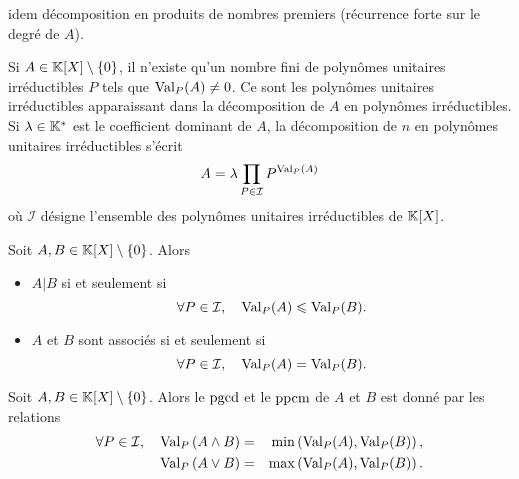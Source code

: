 \documentclass{magnolia}
\begin{document}
\begin{preuve}
idem décomposition en produits de nombres premiers (récurrence forte sur le degré de $A$).
\end{preuve}


\begin{remarques}
\remarque Si $A\in\polyK\setminus\ens{0}$, il n'existe qu'un nombre fini de polynômes unitaires irréductibles $P$ tels que
  ${\rm Val}_P(A)\neq 0$. Ce sont les polynômes unitaires irréductibles apparaissant dans la décomposition
  de $A$ en polynômes irréductibles.
\remarque Si $\lambda\in\mathbb{K}^*$ est le coefficient dominant de $A$, la décomposition de $n$ en polynômes
  unitaires irréductibles s'écrit
  \[A=\lambda \prod_{P\in\mathcal{I}} P^{{\rm Val}_P(A)}\]
  où $\mathcal{I}$ désigne l'ensemble des polynômes unitaires irréductibles
  de $\polyK$.
\end{remarques}

\begin{proposition}
Soit $A,B\in\polyK\setminus\ens{0}$. Alors
\begin{itemize}
\item $A|B$ si et seulement si
  \[\forall P\in\mathcal{I} ,\quad {\rm Val}_P(A)\leqslant {\rm Val}_P(B).\]
\item $A$ et $B$ sont associés si et seulement si
  \[\forall P\in\mathcal{I} ,\quad {\rm Val}_P(A)= {\rm Val}_P(B).\]
\end{itemize}
\end{proposition}

\begin{proposition}
Soit $A,B\in\polyK\setminus\ens{0}$. Alors le $\operatorname{pgcd}$ et le $\operatorname{ppcm}$ de $A$ et $B$ est donné par les relations
  \begin{eqnarray*}
  \forall P\in\mathcal{I} ,\quad {\rm Val}_P \left(A\wedge B\right)&=&\min\left({\rm Val}_P(A),{\rm Val}_P(B)\right),\\
  {\rm Val}_P \left(A\vee B\right)&=&\max\left({\rm Val}_P(A),{\rm Val}_P(B)\right).
  \end{eqnarray*}
\end{proposition}

\end{document}
